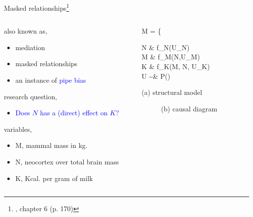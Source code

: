 \begin{frame}
	{Masked relationships\footnote{\citet{McElreath_2020}, chapter 6 (p. 170)}}
	\begin{columns}
		\begin{column}{0.5\textwidth}
			also known as,
			\begin{itemize}
				\item mediation
				\item masked relationships
				\item an instance of \textcolor{blue}{pipe bias}
			\end{itemize}
			
			research question, 
			\begin{itemize}
				\item \textcolor{blue}{Does $N$ has a (direct) effect on $K$?}
			\end{itemize}
			
			variables,
			\begin{itemize}
				\item M, mammal mass in kg.
				\item N, neocortex over total brain mass
				\item K, Kcal. per gram of milk
			\end{itemize}
		\end{column}
		\begin{column}{0.5\textwidth}  
			\begin{equ}
				M = \left\{ \begin{aligned} 
					N \leftarrow & \; f_{N}(U_{N}) \\
					M \leftarrow & \; f_{M}(N,U_{M}) \\
					K \leftarrow & \; f_{K}(M, N, U_{K}) \\
					U \sim & \; P()
				\end{aligned} \right
				\caption*{(a) structural model}
			\end{equ}
			\begin{figure}
				\caption*{(b) causal diagram}
			\end{figure}
		\end{column}
	\end{columns}
\end{frame}
